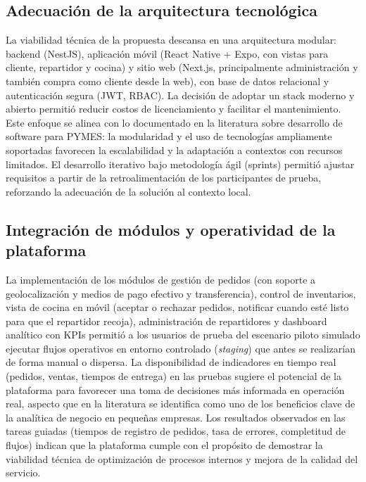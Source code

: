\subsection{Adecuación de la arquitectura tecnológica}

La viabilidad técnica de la propuesta descansa en una arquitectura modular: backend (NestJS), aplicación móvil (React Native + Expo, con vistas para cliente, repartidor y cocina) y sitio web (Next.js, principalmente administración y también compra como cliente desde la web), con base de datos relacional y autenticación segura (JWT, RBAC). La decisión de adoptar un stack moderno y abierto permitió reducir costos de licenciamiento y facilitar el mantenimiento. Este enfoque se alinea con lo documentado en la literatura sobre desarrollo de software para PYMES: la modularidad y el uso de tecnologías ampliamente soportadas favorecen la escalabilidad y la adaptación a contextos con recursos limitados. El desarrollo iterativo bajo metodología ágil (sprints) permitió ajustar requisitos a partir de la retroalimentación de los participantes de prueba, reforzando la adecuación de la solución al contexto local.

\subsection{Integración de módulos y operatividad de la plataforma}

La implementación de los módulos de gestión de pedidos (con soporte a geolocalización y medios de pago efectivo y transferencia), control de inventarios, vista de cocina en móvil (aceptar o rechazar pedidos, notificar cuando esté listo para que el repartidor recoja), administración de repartidores y dashboard analítico con KPIs permitió a los usuarios de prueba del escenario piloto simulado ejecutar flujos operativos en entorno controlado (\textit{staging}) que antes se realizarían de forma manual o dispersa. La disponibilidad de indicadores en tiempo real (pedidos, ventas, tiempos de entrega) en las pruebas sugiere el potencial de la plataforma para favorecer una toma de decisiones más informada en operación real, aspecto que en la literatura se identifica como uno de los beneficios clave de la analítica de negocio en pequeñas empresas. Los resultados observados en las tareas guiadas (tiempos de registro de pedidos, tasa de errores, completitud de flujos) indican que la plataforma cumple con el propósito de demostrar la viabilidad técnica de optimización de procesos internos y mejora de la calidad del servicio.

